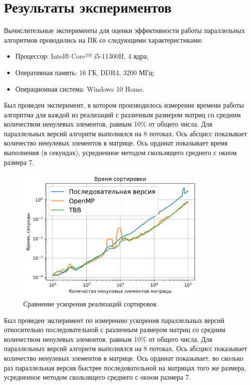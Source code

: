\documentclass{report}
\begin{document}
\section*{Результаты экспериментов}
Вычислительные эксперименты для оценки эффективности работы параллельных алгоритмов проводились на ПК со следующими характеристиками:
\begin{itemize}
    \item Процессор: Intel® Core™ i5-11300H, 4 ядра;
    \item Оперативная память: 16 ГБ, DDR4, 3200 МГц;
    \item Операционная система: Windows 10 Home.
\end{itemize}
\par Был проведен эксперимент, в котором производилось измерение времени работы алгоритма для каждой из реализаций с различным размером матриц со средним количеством ненулевых элементов, равным 10\% от общего числа. Для параллельных версий алгоритм выполнялся на 8 потоках. Ось абсцисс показывает количество ненулевых элементов в матрице. Ось ординат показывает время выполнения (в секундах), усредненное методом скользящего среднего с окном размера 7.
\begin{figure}[H]
    \centering
    \includegraphics[width=0.85\textwidth]{../../modules/task_1/kolosova_a_complex_ccs/images/time_comparison.png}
    \caption{Сравнение ускорения реализаций сортировок}
    \label{fig:my_label_1}
\end{figure}
\par Был проведен эксперимент по измерению ускорения параллельных версий относительно последовательной с различным размером матриц со средним количеством ненулевых элементов, равным 10\% от общего числа. Для параллельных версий алгоритм выполнялся на 8 потоках. Ось абсцисс показывает количество ненулевых элементов в матрице. Ось ординат показывает, во сколько раз параллельная версия быстрее последовательной на матрицах того же размера, усредненное методом скользящего среднего с окном размера 7.
\end{document}
